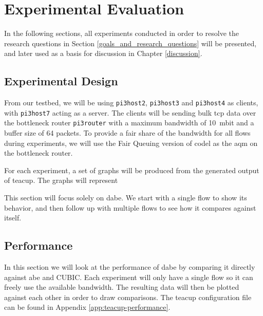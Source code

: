 \chapter{Experimental Evaluation} \label{ch:experimental_evaluation}

In the following sections, all experiments conducted in order to resolve the research questions in Section \ref{goals_and_research_questions} will be presented, and later used as a basis for discussion in Chapter \ref{discussion}. 









\section{Experimental Design}

From our testbed, we will be using \lstinline{pi3host2}, \lstinline{pi3host3} and \lstinline{pi3host4} as clients, with \lstinline{pi3host7} acting as a server. The clients will be sending bulk \gls{tcp} data over the bottleneck router \lstinline{pi3router} with a maximum bandwidth of \SI{10}{mbit} and a buffer size of 64 packets. To provide a fair share of the bandwidth for all flows during experiments, we will use the Fair Queuing version of \gls{codel} as the \gls{aqm} on the bottleneck router.


For each experiment, a set of graphs will be produced from the generated output of \gls{teacup}. The graphs will represent 



This section will focus solely on \gls{dabe}. We start with a single flow to show its behavior, and then follow up with multiple flows to see how it compares against itself.









\section{Performance} \label{sec:performance}

In this section we will look at the performance of \gls{dabe} by comparing it directly against \gls{abe} and CUBIC. Each experiment will only have a single flow so it can freely use the available bandwidth. The resulting data will then be plotted against each other in order to draw comparisons. The \gls{teacup} configuration file can be found in Appendix \ref{app:teacup-performance}.


